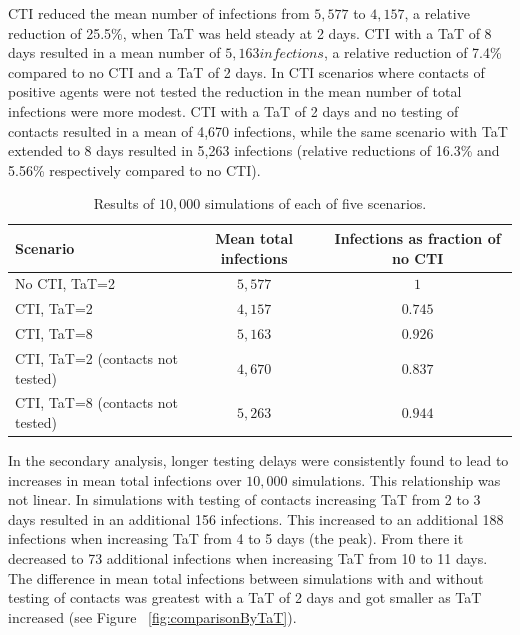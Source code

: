 \documentclass{article}
\begin{document}
CTI reduced the mean number of infections from $5,577$ to $4,157$, a relative
reduction of 25.5\%, when TaT was held steady at 2 days. CTI with a TaT of 8
days resulted in a mean number of $5,163 infections$, a relative reduction of 7.4\%
compared to no CTI and a TaT of 2 days. In CTI scenarios where contacts of
positive agents were not tested the reduction in the mean number of total
infections were more modest. CTI with a TaT of 2 days and no testing of contacts
resulted in a mean of 4,670 infections, while the same scenario with TaT
extended to 8 days resulted in 5,263 infections (relative reductions of 16.3\%
and 5.56\% respectively compared to no CTI).

\begin{table}[ht!]
  \centering
  \begin{tabular}{|l|c|c|}
    \hline
  Scenario & Mean total infections & Infections as fraction of no CTI \\ \hline
  No CTI, TaT=2 & $5,577$ & $1$  \\ \hline
  CTI, TaT=2 & $4,157$ & $0.745$  \\ \hline
  CTI, TaT=8 & $5,163$ & $0.926$  \\ \hline
  CTI, TaT=2 (contacts not tested) & $4,670$ & $0.837$  \\ \hline
  CTI, TaT=8 (contacts not tested) & $5,263$ & $0.944$  \\ \hline
\end{tabular}
  \caption{Results of $10,000$ simulations of each of five scenarios.}
  \label{table:results_scenarios}
\end{table}

In the secondary analysis, longer testing delays were consistently found to lead
to increases in mean total infections over $10,000$ simulations. This relationship
was not linear. In simulations with testing of contacts increasing TaT from 2 to
3 days resulted in an additional 156 infections. This increased to an additional
188 infections when increasing TaT from 4 to 5 days (the peak). From there it
decreased to 73 additional infections when increasing TaT from 10 to 11
days. The difference in mean total infections between simulations with and
without testing of contacts was greatest with a TaT of 2 days and got smaller as
TaT increased (see Figure ~\ref{fig:comparisonByTaT}).
\end{document}
